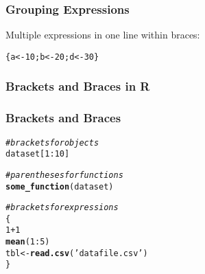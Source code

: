 \documentclass[12pt]{beamer}\usepackage[]{graphicx}\usepackage[]{color}
\makeatletter
\newcommand{\hlnum}[1]{\textcolor[rgb]{0.686,0.059,0.569}{#1}}%
\newcommand{\hlstr}[1]{\textcolor[rgb]{0.192,0.494,0.8}{#1}}%
\newcommand{\hlcom}[1]{\textcolor[rgb]{0.678,0.584,0.686}{\textit{#1}}}%
\newcommand{\hlopt}[1]{\textcolor[rgb]{0,0,0}{#1}}%
\newcommand{\hlstd}[1]{\textcolor[rgb]{0.345,0.345,0.345}{#1}}%
\newcommand{\hlkwb}[1]{\textcolor[rgb]{0.69,0.353,0.396}{#1}}%
\newcommand{\hlkwd}[1]{\textcolor[rgb]{0.737,0.353,0.396}{\textbf{#1}}}%
\newenvironment{kframe}{%
 \def\at@end@of@kframe{}%
 \ifinner\ifhmode%
  \def\at@end@of@kframe{\end{minipage}}%
  \begin{minipage}{\columnwidth}%
 \fi\fi%
 \def\FrameCommand##1{\hskip\@totalleftmargin \hskip-\fboxsep
 \colorbox{shadecolor}{##1}\hskip-\fboxsep
     \hskip-\linewidth \hskip-\@totalleftmargin \hskip\columnwidth}%
 \MakeFramed {\advance\hsize-\width
   \@totalleftmargin\z@ \linewidth\hsize
   \@setminipage}}%
 {\par\unskip\endMakeFramed%
 \at@end@of@kframe}
\newenvironment{knitrout}{}{} %
\makeatother
\begin{document}

\begin{frame}[fragile]
\frametitle{Grouping Expressions}

Multiple expressions in one line within braces:
\begin{knitrout}\footnotesize
{}\color{fgcolor}\begin{kframe}
\begin{alltt}
\hlstd{\{a} \hlkwb{<-} \hlnum{10}\hlstd{; b} \hlkwb{<-} \hlnum{20}\hlstd{; d} \hlkwb{<-} \hlnum{30}\hlstd{\}}
\end{alltt}
\end{kframe}
\end{knitrout}

\end{frame}


\begin{frame}[fragile]
\frametitle{Brackets and Braces in R}
\begin{center}
\end{center}
\end{frame}


\begin{frame}[fragile]
\frametitle{Brackets and Braces}
\begin{knitrout}\footnotesize
{}\color{fgcolor}\begin{kframe}
\begin{alltt}
\hlcom{# brackets for objects}
\hlstd{dataset[}\hlnum{1}\hlopt{:}\hlnum{10}\hlstd{]}
\end{alltt}
\end{kframe}
\end{knitrout}

\pause
\begin{knitrout}\footnotesize
{}\color{fgcolor}\begin{kframe}
\begin{alltt}
\hlcom{# parentheses for functions}
\hlkwd{some_function}\hlstd{(dataset)}
\end{alltt}
\end{kframe}
\end{knitrout}

\pause
\begin{knitrout}\footnotesize
{}\color{fgcolor}\begin{kframe}
\begin{alltt}
\hlcom{# brackets for expressions}
\hlstd{\{}
  \hlnum{1} \hlopt{+} \hlnum{1}
  \hlkwd{mean}\hlstd{(}\hlnum{1}\hlopt{:}\hlnum{5}\hlstd{)}
  \hlstd{tbl} \hlkwb{<-} \hlkwd{read.csv}\hlstd{(}\hlstr{'datafile.csv'}\hlstd{)}
\hlstd{\}}
\end{alltt}
\end{kframe}
\end{knitrout}
\end{frame}
\end{document}
